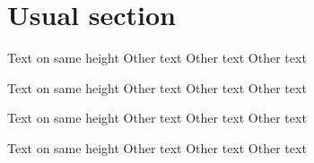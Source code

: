 \documentclass{kapital}
\begin{document}
  \tableofcontents*
  \mainmatter

  \section{Usual section}

  Text on same height
  \clearpage
  Other text
    \clearpage
  Other text
    \clearpage
  Other text


  Text on same height
  \clearpage
  Other text
    \clearpage
  Other text
    \clearpage
  Other text



  Text on same height
  \clearpage
  Other text
    \clearpage
  Other text
    \clearpage
  Other text

  

  Text on same height
  \clearpage
  Other text
    \clearpage
  Other text
    \clearpage
  Other text








\end{document}
